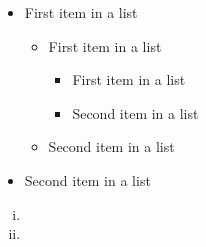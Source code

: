 \documentclass[12pt,twoside]{article}
\begin{document}


\begin{problems}

\problem  %

\begin{problemparts}
\problempart %
\begin{itemize}
      \item First item in a list 
          \begin{itemize}
              \item First item in a list 
                  \begin{itemize}
                      \item First item in a list 
                      \item Second item in a list 
                  \end{itemize}
              \item Second item in a list 
          \end{itemize}
      \item Second item in a list 
\end{itemize}
\problempart %
\problempart %
\problempart %
\end{problemparts}

\newpage
\problem  %

\begin{problemparts}
\problempart %
\begin{enumerate}[i.]
  \item %
  \item %
\end{enumerate}


\end{problemparts}
\end{problems}
\end{document}
